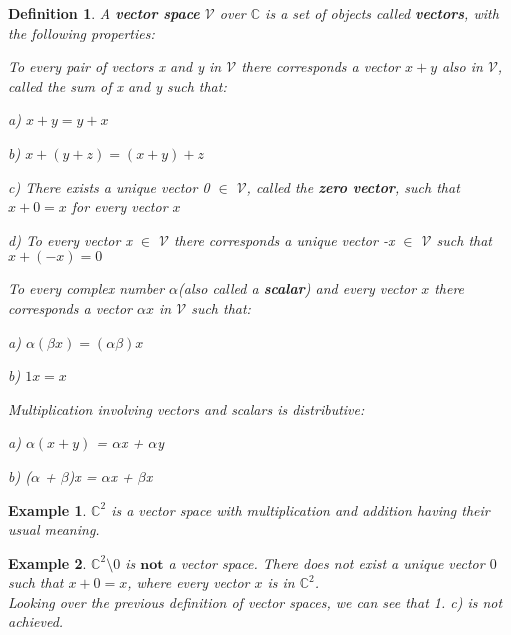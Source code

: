 \documentclass[12pt,a4paper]{article}
\newtheorem{defn}[thm]{Definition}
\newtheorem{exmp}{Example}[section]
\begin{document}
\begin{defn} A \textbf{vector space} $\mathcal{V}$ over $\mathbb{C}$ is a set of objects called \textbf{vectors}, with the following properties:
\item[1.] To every pair of vectors x and y in $\mathcal{V}$ there corresponds a vector $x + y$ also in $\mathcal{V}$, called the \textit{sum} of x and y such that:
\item \hspace{1cm} a) $x + y = y + x$
\item \hspace{1cm} b) $x + (y + z) = (x  + y) + z$
\item \hspace{1cm} c) There exists a unique vector 0 $\in$ $\mathcal{V}$, called the \textbf{zero vector}, such that $x + 0 = x $ for every vector $x$
\item \hspace{1cm} d) To every vector x $\in$ $\mathcal{V}$ there corresponds a unique vector -x $\in$ $\mathcal{V}$ such that $x + (-x) = 0$
\\
\item[2.] To every complex number $\alpha$(also called a \textbf{scalar}) and every vector $x$ there corresponds a vector $\alpha$$x$ in $\mathcal{V}$ such that:
\item \hspace{1cm} a) $\alpha(\beta x) = (\alpha\beta)x$
\item \hspace{1cm} b) $1x = x$
\\
\item[3.] Multiplication involving vectors and scalars is distributive:
\item \hspace{1cm} a) $\alpha$$(x + y)$ = $\alpha$x + $\alpha$y
\item \hspace{1cm} b) ($\alpha$ + $\beta$)x = $\alpha$x + $\beta$x
\end{defn}
\begin{exmp}$\mathbb{C}^2$ is a vector space with multiplication and addition having their usual meaning.
\end{exmp}
\begin{exmp}$\mathbb{C}^2\setminus 0$ is $\textbf{not}$ a vector space. There does not exist a unique vector $0$ such that $x + 0 = x$, where every vector $x$ is in $\mathbb{C}^2$.\\
Looking over the previous definition of vector spaces, we can see that 1. c) is not achieved.
\end{exmp}
\end{document}
